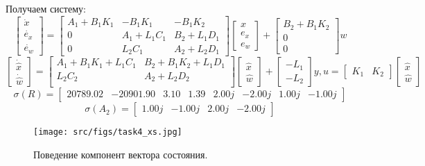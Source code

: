 Получаем систему:
\[
    \begin{bmatrix}
        \dot{x} \\
        \dot{e_x} \\
        \dot{e_w}
    \end{bmatrix} = 
    \begin{bmatrix}
        A_1 + B_1K_1 & -B_1K_1 & -B_1K_2 \\
        0 & A_1 + L_1C_1 & B_2 + L_1 D_1 \\
        0 & L_2 C_1 & A_2 + L_2 D_1
    \end{bmatrix}
    \begin{bmatrix}
        x \\
        e_x \\
        e_w
    \end{bmatrix} 
    + 
    \begin{bmatrix}
        B_2 + B_1 K_2 \\
        0 \\
        0
    \end{bmatrix} w
\]
\[
    \begin{bmatrix}
        \dot{\hat{x}} \\
        \dot{\hat{w}}
    \end{bmatrix} = 
    \begin{bmatrix}
        A_1 + B_1K_1 + L_1C_1 & B_2 + B_1K_2 + L_1D_1 \\
        L_2C_2 & A_2 + L_2D_2 \\
    \end{bmatrix}
    \begin{bmatrix}
        \hat{x} \\
        \hat{w}
    \end{bmatrix}
    +
    \begin{bmatrix}
        -L_1 \\ -L_2 
    \end{bmatrix}y, u = \begin{bmatrix}
        K_1 & K_2 
    \end{bmatrix}\begin{bmatrix}
        {\hat{x}} \\ {\hat{w}} 
    \end{bmatrix}
\]
\[\sigma (R) = \begin{bmatrix}
    20789.02 & -20901.90 &  3.10 &  1.39 &  2.00j &  -2.00j &  1.00j &  -1.00j
  \end{bmatrix}\]
  \[\sigma (A_2) = \begin{bmatrix}
    1.00j &  -1.00j &  2.00j &  -2.00j
  \end{bmatrix}\]
\begin{figure}[ht!]
    \centering
    \texttt{[image: src/figs/task4\_xs.jpg]}
    \caption{Поведение компонент вектора состояния.}
    \label{fig:task4_xs}
  \end{figure} 

